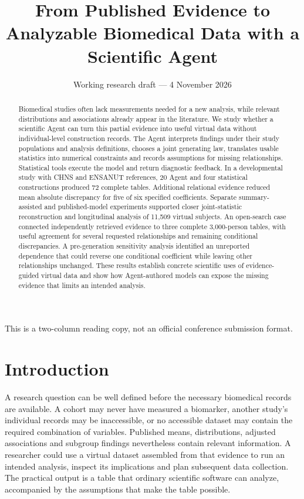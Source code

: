 \documentclass[10pt,twocolumn]{article}
\title{From Published Evidence to Analyzable Biomedical Data with a Scientific Agent}
\author{\small Working research draft --- 4 November 2026}
\date{}
\begin{document}
\maketitle
\begingroup\footnotesize\noindent This is a two-column reading copy, not an official conference submission format.\par\endgroup
\begin{abstract}

Biomedical studies often lack measurements needed for a new analysis, while relevant distributions and associations already appear in the literature. We study whether a scientific Agent can turn this partial evidence into useful virtual data without individual-level construction records. The Agent interprets findings under their study populations and analysis definitions, chooses a joint generating law, translates usable statistics into numerical constraints and records assumptions for missing relationships. Statistical tools execute the model and return diagnostic feedback. In a developmental study with CHNS and ENSANUT references, 20 Agent and four statistical constructions produced 72 complete tables. Additional relational evidence reduced mean absolute discrepancy for five of six specified coefficients. Separate summary-assisted and published-model experiments supported closer joint-statistic reconstruction and longitudinal analysis of 11,509 virtual subjects. An open-search case connected independently retrieved evidence to three complete 3,000-person tables, with useful agreement for several requested relationships and remaining conditional discrepancies. A pre-generation sensitivity analysis identified an unreported dependence that could reverse one conditional coefficient while leaving other relationships unchanged. These results establish concrete scientific uses of evidence-guided virtual data and show how Agent-authored models can expose the missing evidence that limits an intended analysis.

\end{abstract}

\section{Introduction}

A research question can be well defined before the necessary biomedical records are available. A cohort may never have measured a biomarker, another study's individual records may be inaccessible, or no accessible dataset may contain the required combination of variables. Published means, distributions, adjusted associations and subgroup findings nevertheless contain relevant information. A researcher could use a virtual dataset assembled from that evidence to run an intended analysis, inspect its implications and plan subsequent data collection. The practical output is a table that ordinary scientific software can analyze, accompanied by the assumptions that make the table possible.
\end{document}

